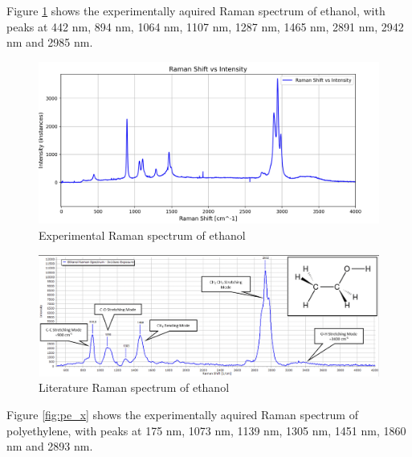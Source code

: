     \newpage

    Figure \ref{fig:eth_x} shows the experimentally aquired Raman spectrum of ethanol, with peaks at 442 nm, 894 nm, 1064 nm, 1107 nm, 1287 nm, 1465 nm, 2891 nm, 2942 nm and 2985 nm.

    \newpage

    \begin{figure}[h]
        \includegraphics[width=\textwidth]{images/raman_spectra/raman_shift_ethanol.png}
        \caption{Experimental Raman spectrum of ethanol}
        \label{fig:eth_x}
    \end{figure}

    \begin{figure}[h]
        \centering
        \includegraphics[width=\textwidth]{images/lit_raman/ethanol.png}
        \caption{Literature Raman spectrum of ethanol \cite{spectrumeth}}
        \label{fig:eth_l}
    \end{figure}

    \newpage

    Figure \ref{fig:pe_x} shows the experimentally aquired Raman spectrum of polyethylene, with peaks at 175 nm, 1073 nm, 1139 nm, 1305 nm, 1451 nm, 1860 nm and 2893 nm.

    \newpage

